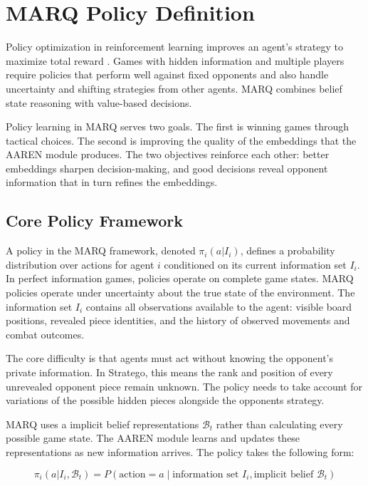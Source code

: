 \section{MARQ Policy Definition}

Policy optimization in reinforcement learning improves an agent's strategy to maximize total reward \cite{DRLImperfectInfo2023}. Games with hidden information and multiple players require policies that perform well against fixed opponents and also handle uncertainty and shifting strategies from other agents. MARQ combines belief state reasoning with value-based decisions.

Policy learning in MARQ serves two goals. The first is winning games through tactical choices. The second is improving the quality of the embeddings that the AAREN module produces. The two objectives reinforce each other: better embeddings sharpen decision-making, and good decisions reveal opponent information that in turn refines the embeddings.

\subsection{Core Policy Framework}

A policy in the MARQ framework, denoted $\pi_i(a|I_i)$, defines a probability distribution over actions for agent $i$ conditioned on its current information set $I_i$. In perfect information games, policies operate on complete game states. MARQ policies operate under uncertainty about the true state of the environment. The information set $I_i$ contains all observations available to the agent: visible board positions, revealed piece identities, and the history of observed movements and combat outcomes.

The core difficulty is that agents must act without knowing the opponent's private information. In Stratego, this means the rank and position of every unrevealed opponent piece remain unknown. The policy needs to take account for variations of the possible hidden pieces alongside the opponents strategy.

MARQ uses a implicit belief representations $\mathcal{B}_t$ rather than calculating every possible game state. The AAREN module learns and updates these representations as new information arrives. The policy takes the following form:

\begin{equation}
\pi_i(a|I_i, \mathcal{B}_t) = P(\text{action} = a \mid \text{information set } I_i, \text{implicit belief } \mathcal{B}_t)
\end{equation}

